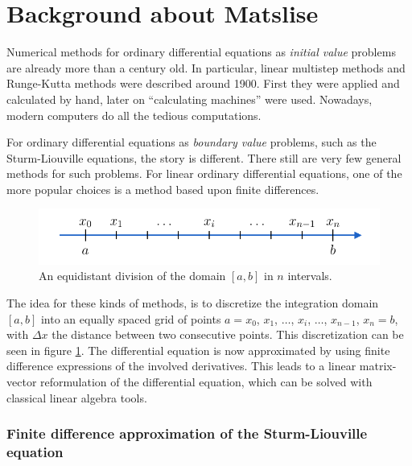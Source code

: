 \section{Background about Matslise}

Numerical methods for ordinary differential equations as \emph{initial value} problems are already more than a century old. In particular, linear multistep methods and Runge-Kutta methods were described around 1900. First they were applied and calculated by hand, later on ``calculating machines'' \cite{milne_numerical_1926} were used. Nowadays, modern computers do all the tedious computations.

For ordinary differential equations as \emph{boundary value} problems, such as the Sturm-Liouville equations, the story is different. There still are very few general methods for such problems. For linear ordinary differential equations, one of the more popular choices is a method based upon finite differences.

\begin{figure}
    \begin{center}
        \includegraphics[width=\textwidth]{img/chapter2/finite_difference_grid.pdf}
    \end{center}
    \caption{An equidistant division of the domain $[a, b]$ in $n$ intervals.}
    \label{fig:c2_finite_difference_grid}
\end{figure}

The idea for these kinds of methods, is to discretize the integration domain $[a, b]$ into an equally spaced grid of points $a = x_0$, $x_1$, $\dots$, $x_i$, $\dots$, $x_{n-1}$, $x_{n} = b$, with $\Delta x$ the distance between two consecutive points. This discretization can be seen in figure \ref{fig:c2_finite_difference_grid}. The differential equation is now approximated by using finite difference expressions of the involved derivatives. This leads to a linear matrix-vector reformulation of the differential equation, which can be solved with classical linear algebra tools.

\subsubsection{Finite difference approximation of the Sturm-Liouville equation}

